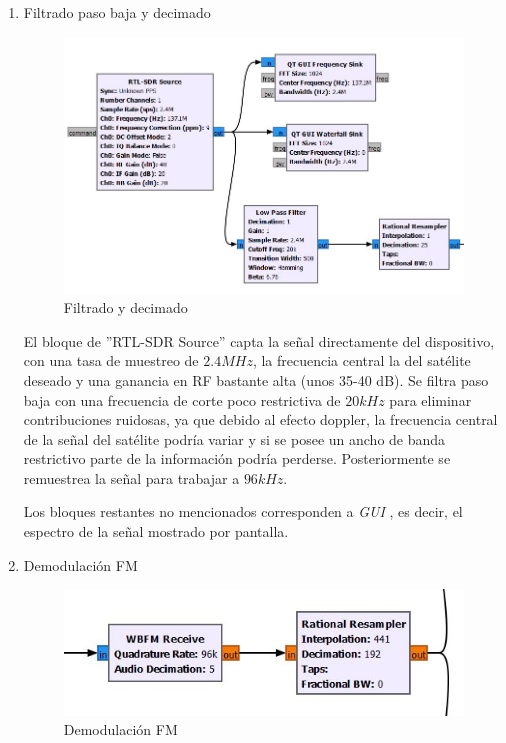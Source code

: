 \documentclass[a4paper,openright,12pt]{article}
\begin{document}
	\begin{enumerate}
	\item Filtrado paso baja y decimado
	
		\begin{figure}[hbtp]
 \centering
 \includegraphics[width = 12cm]{imagenes/primer_paso.JPG}
 \caption{Filtrado y decimado}
 \label{filtardo_decimado}
 \end{figure}
 
 El bloque de ''RTL-SDR Source'' capta la señal directamente del dispositivo, con una tasa de muestreo de $2.4 MHz$, la frecuencia central la del satélite deseado y una ganancia en RF bastante alta (unos 35-40 dB).
 Se filtra paso baja con una frecuencia de corte poco restrictiva de $20 kHz$ para eliminar contribuciones ruidosas, ya que debido al efecto doppler, la frecuencia central de la señal del satélite podría variar y si se posee un ancho de banda restrictivo parte de la información podría perderse. Posteriormente se remuestrea la señal para trabajar a $96 kHz$.

Los bloques restantes no mencionados corresponden a \textit{GUI }, es decir, el espectro de la señal mostrado por pantalla.
 
 
 
	\item Demodulación FM
	
		\begin{figure}[hbtp]
 \centering
 \includegraphics[width = 12cm]{imagenes/wbfm.JPG}
 \caption{Demodulación FM}
 \label{wbfm}
 \end{figure}
 

\end{enumerate}
\end{document}
